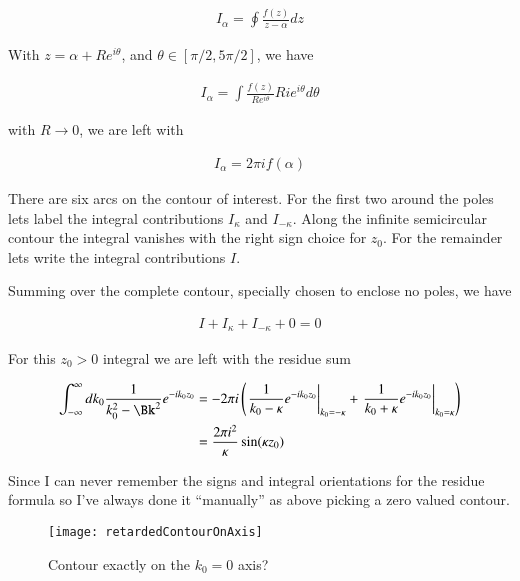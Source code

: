 \begin{align}\label{eqn:jacksonRet:boo10}
I_\alpha = \oint \frac{f(z)}{z - \alpha} dz
\end{align}

With $z = \alpha + R e^{i\theta}$, and $\theta \in [\pi/2, 5\pi/2]$, we have

\begin{align}\label{eqn:jacksonRet:boo11}
I_\alpha = \int \frac{f(z)}{R e^{i\theta}} R i e^{i\theta} d\theta
\end{align}

with $R \rightarrow 0$, we are left with 

\begin{align}\label{eqn:jacksonRet:boo12}
I_\alpha = 2 \pi i f(\alpha)
\end{align}

There are six arcs on the contour of interest.  For the first two around the poles lets label the integral contributions $I_\kappa$ and $I_{-\kappa}$.  Along the infinite semicircular contour the integral vanishes with the right sign choice for $z_0$.  For the remainder lets write the integral contributions $I$.

Summing over the complete contour, specially chosen to enclose no poles, we have

\begin{align}\label{eqn:jacksonRet:boo13}
I + I_\kappa + I_{-\kappa} + 0 = 0 
\end{align}

For this $z_0 > 0$ integral we are left with the residue sum

\begin{align*}
\int_{-\infty}^\infty dk_0 \inv{k_0^2 - \Bk^2} e^{-i k_0 z_0} 
&= 
- 2 \pi i \left( 
{\left. \inv{k_0 - \kappa} e^{-i k_0 z_0} \right\vert}_{k_0 = -\kappa}
+{\left. \inv{k_0 + \kappa} e^{-i k_0 z_0} \right\vert}_{k_0 = \kappa}
\right) \\
&= 
\frac{2 \pi i^2}{\kappa} \sin(\kappa z_0)
\end{align*}

Since I can never remember the signs and integral orientations for the residue formula so I've always done it ``manually'' as above picking a zero valued contour.

\begin{figure}[htp]
\centering
\texttt{[image: retardedContourOnAxis]}
\caption{Contour exactly on the $k_0 = 0$ axis?}\label{fig:jacksonRet:retardedContourOnAxis}
\end{figure}

